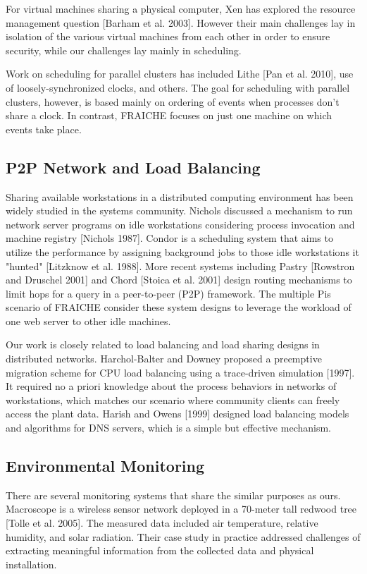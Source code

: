 \documentclass[a4paper]{acm_proc_article-sp}
\begin{document}
For virtual machines sharing a physical computer, Xen has explored the resource management question [Barham et al. 2003].  However their main challenges lay in isolation of the various virtual machines from each other in order to ensure security, while our challenges lay mainly in scheduling.

Work on scheduling for parallel clusters has included Lithe [Pan et al. 2010], use of loosely-synchronized clocks, and others.  The goal for scheduling with parallel clusters, however, is based mainly on ordering of events when processes don't share a clock.  In contrast, FRAICHE focuses on just one machine on which events take place.

\subsection{P2P Network and Load Balancing}

Sharing available workstations in a distributed computing environment has been widely studied in the systems community. Nichols discussed a mechanism to run network server programs on idle workstations considering process invocation and machine registry [Nichols 1987]. Condor is a scheduling system that aims to utilize the performance by assigning background jobs to those idle workstations it "hunted" [Litzknow et al. 1988]. More recent systems including Pastry [Rowstron and Druschel 2001] and Chord [Stoica et al. 2001] design routing mechanisms to limit hops for a query in a peer-to-peer (P2P) framework. The multiple Pis scenario of FRAICHE consider these system designs to leverage the workload of one web server to other idle machines.

Our work is closely related to load balancing and load sharing designs in distributed networks. Harchol-Balter and Downey proposed a preemptive migration scheme for CPU load balancing using a trace-driven simulation [1997]. It required no a priori knowledge about the process behaviors in networks of workstations, which matches our scenario where community clients can freely access the plant data. Harish and Owens [1999] designed load balancing models and algorithms for DNS servers, which is a simple but effective mechanism.

\subsection{Environmental Monitoring}

There are several monitoring systems that share the similar purposes as ours. Macroscope is a wireless sensor network deployed in a 70-meter tall redwood tree [Tolle et al. 2005]. The measured data included air temperature, relative humidity, and solar radiation. Their case study in practice addressed challenges of extracting meaningful information from the collected data and physical installation. 
\end{document}
